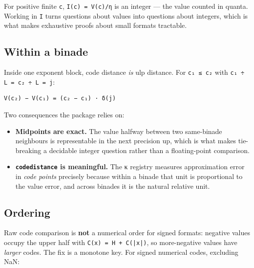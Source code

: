 For positive finite \texttt{c}, \texttt{I(c) = V(c)/η} is an integer — the value counted in quanta. Working in \texttt{I} turns questions about values into questions about integers, which is what makes exhaustive proofs about small formats tractable.



\subsection{Within a binade}



\label{11566826794172623970}{}


Inside one exponent block, code distance \emph{is} ulp distance. For \texttt{c₁ ≤ c₂} with \texttt{c₁ ÷ L = c₂ ÷ L = j}:




\nopagebreak[4]
\begin{verbatim}
V(c₂) − V(c₁) = (c₂ − c₁) · δ(j)
\end{verbatim}



Two consequences the package relies on:



\begin{itemize}
\item \textbf{Midpoints are exact.} The value halfway between two same-binade neighbours is representable in the next precision up, which is what makes tie-breaking a decidable integer question rather than a floating-point comparison.


\item \textbf{\texttt{codedistance} is meaningful.} The κ registry measures approximation error in \emph{code points} precisely because within a binade that unit is proportional to the value error, and across binades it is the natural relative unit.

\end{itemize}


\subsection{Ordering}



\label{14355626661080959143}{}


Raw code comparison is \textbf{not} a numerical order for signed formats: negative values occupy the upper half with \texttt{C(x) = H + C(|x|)}, so more-negative values have \emph{larger} codes. The fix is a monotone key. For signed numerical codes, excluding NaN:




